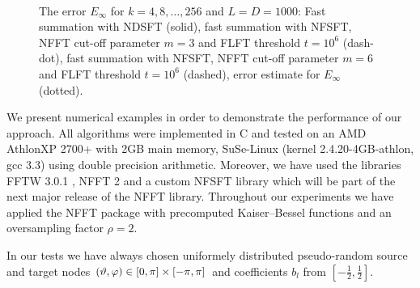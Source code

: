 \begin{figure}[tb]
  \centering
  \hfill
  \\
  \caption{The error $E_{\infty}$ for $k = 4,8,\ldots,256$ and $L = D = 1000$: 
  Fast summation with NDSFT (solid), fast summation with NFSFT, 
  NFFT cut-off parameter $m = 3$ and FLFT threshold $t = 10^6$ (dash-dot), 
  fast summation with NFSFT, NFFT cut-off 
  parameter $m = 6$ and FLFT threshold $t = 10^6$ (dashed), error estimate for 
  $E_{\infty}$ (dotted).}
  \label{fig:error}
\end{figure}

We present numerical examples in order to demonstrate the performance of
our approach. All algorithms were implemented in C and tested on an 
AMD Athlon\texttrademark XP 2700+ with 2GB main memory, SuSe-Linux 
(kernel 2.4.20-4GB-athlon, gcc 3.3) using double precision arithmetic. 
Moreover, we have used the libraries FFTW 3.0.1 \cite{fftw}, NFFT 2
\cite{kupo02C} and a custom NFSFT library which will be part of the next 
major release of the NFFT library. Throughout our experiments we have 
applied the NFFT package \cite{kupo02C} with precomputed Kaiser--Bessel 
functions and an oversampling factor $\rho=2$.

In our tests we have always chosen uniformely distributed pseudo-random 
source and target nodes 
$\left(\vartheta,\varphi\right) \in [0,\pi] \times [-\pi,\pi]$ and 
coefficients $b_l$ from $\left[-\frac{1}{2},\frac{1}{2}\right]$.

